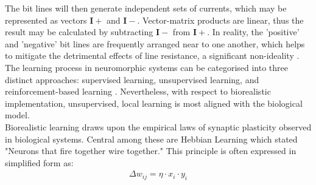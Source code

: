 \noindent The bit lines will then generate independent sets of currents, which may be represented as vectors $\mathbf{I}+$ and $\mathbf{I}-$. Vector-matrix products are linear, thus the result may be calculated by subtracting $\mathbf{I}-$ from $\mathbf{I}+$. In reality, the 'positive' and 'negative' bit lines are frequently arranged near to one another, which helps to mitigate the detrimental effects of line resistance, a significant non-ideality \cite{joksas2020committee}. \\







\noindent The learning process in neuromorphic systems can be categorised into three distinct approaches: supervised learning, unsupervised learning, and reinforcement-based learning \cite{stone2019artificial}. Nevertheless, with respect to biorealistic implementation, unsupervised, local learning is most aligned with the biological model. \\

\noindent Biorealistic learning draws upon the empirical laws of synaptic plasticity observed in biological systems. Central among these are Hebbian Learning \cite{kempter1999hebbian} which stated "Neurons that fire together wire together." This principle is often expressed in simplified form as:\\
\begin{align}
    \Delta w_{ij} = \eta \cdot x_i \cdot y_i \label{eq:2.31}
\end{align}


